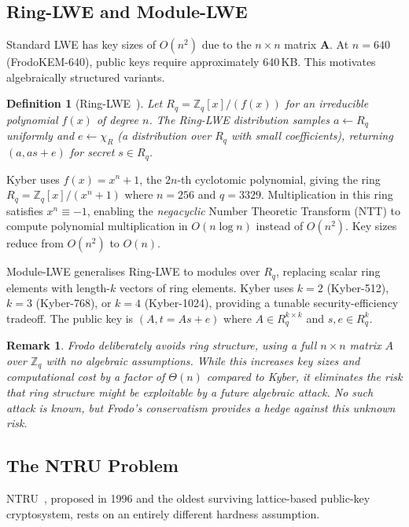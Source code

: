 \documentclass[12pt,a4paper]{report}
\newtheorem{definition}{Definition}[chapter]
\newtheorem{remark}{Remark}[chapter]
\begin{document}
\subsection{Ring-LWE and Module-LWE}

Standard LWE has key sizes of $O(n^2)$ due to the $n \times n$ matrix $\mathbf{A}$.
At $n = 640$ (FrodoKEM-640), public keys require approximately 640\,KB. This motivates
algebraically structured variants.

\begin{definition}[Ring-LWE~\cite{lyubashevsky2010}]
Let $R_q = \mathbb{Z}_q[x]/(f(x))$ for an irreducible polynomial $f(x)$ of degree $n$.
The Ring-LWE distribution samples $a \leftarrow R_q$ uniformly and $e \leftarrow \chi_R$
(a distribution over $R_q$ with small coefficients), returning $(a, as + e)$ for secret
$s \in R_q$.
\end{definition}

Kyber uses $f(x) = x^n + 1$, the $2n$-th cyclotomic polynomial, giving the ring
$R_q = \mathbb{Z}_q[x]/(x^n+1)$ where $n=256$ and $q=3329$. Multiplication in this
ring satisfies $x^n \equiv -1$, enabling the \emph{negacyclic} Number Theoretic
Transform (NTT) to compute polynomial multiplication in $O(n \log n)$ instead of
$O(n^2)$. Key sizes reduce from $O(n^2)$ to $O(n)$.

Module-LWE generalises Ring-LWE to modules over $R_q$, replacing scalar ring elements
with length-$k$ vectors of ring elements. Kyber uses $k=2$ (Kyber-512), $k=3$
(Kyber-768), or $k=4$ (Kyber-1024), providing a tunable security-efficiency tradeoff.
The public key is $(A, t = As + e)$ where $A \in R_q^{k \times k}$ and $s, e \in R_q^k$.

\begin{remark}
Frodo deliberately avoids ring structure, using a full $n \times n$ matrix $A$ over
$\mathbb{Z}_q$ with no algebraic assumptions. While this increases key sizes and
computational cost by a factor of $\Theta(n)$ compared to Kyber, it eliminates the
risk that ring structure might be exploitable by a future algebraic attack. No such
attack is known, but Frodo's conservatism provides a hedge against this unknown risk.
\end{remark}

\subsection{The NTRU Problem}

NTRU~\cite{hoffstein1998}, proposed in 1996 and the oldest surviving lattice-based
public-key cryptosystem, rests on an entirely different hardness assumption.
\end{document}
